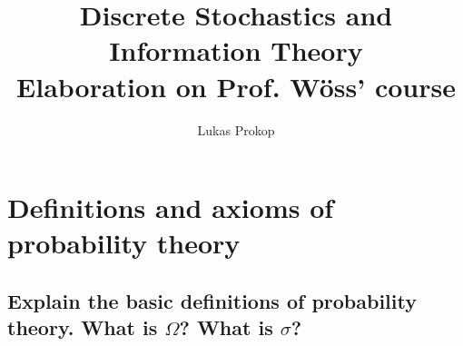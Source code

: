 \documentclass[a4paper]{article}
\title{
  Discrete Stochastics and Information Theory  \\
  \small{Elaboration on Prof. Wöss' course}
}
\author{Lukas Prokop}
\theoremstyle{definition}
\begin{document}
\maketitle
\tableofcontents
\clearpage


\section{Definitions and axioms of probability theory}

\subsection[Basic definitions]{Explain the basic definitions of probability theory. What is $\Omega$? What is $\sigma$?}
%
\end{document}
